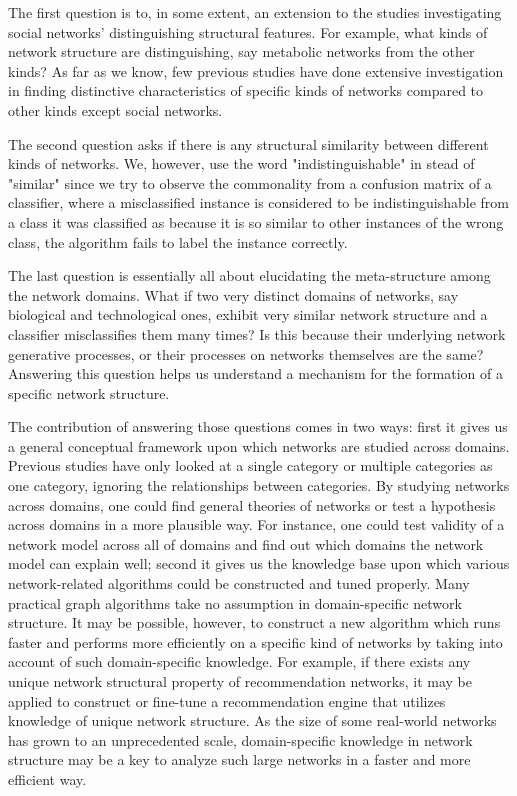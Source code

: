 The first question is to, in some extent, an extension to the studies investigating social networks' distinguishing structural features. For example, what kinds of network structure are distinguishing, say metabolic networks from the other kinds? As far as we know, few previous studies have done extensive investigation in finding distinctive characteristics of specific kinds of networks compared to other kinds except social networks.

The second question asks if there is any structural similarity between different kinds of networks. We, however, use the word "indistinguishable" in stead of "similar" since we try to observe the commonality from a confusion matrix of a classifier, where a misclassified instance is considered to be indistinguishable from a class it was classified as because it is so similar to other instances of the wrong class, the algorithm fails to label the instance correctly.


The last question is essentially all about elucidating the meta-structure among the network domains. What if two very distinct domains of networks, say biological and technological ones, exhibit very similar network structure and a classifier misclassifies them many times? Is this because their underlying network generative processes, or their processes on networks themselves are the same? Answering this question helps us understand a mechanism for the formation of a specific network structure.


The contribution of answering those questions comes in two ways: first it gives us a general conceptual framework upon which networks are studied across domains. Previous studies have only looked at a single category or multiple categories as one category, ignoring the relationships between categories. By studying networks across domains, one could find general theories of networks or test a hypothesis across domains in a more plausible way.  For instance, one could test validity of a network model across all of domains and find out which domains the network model can explain well; second it gives us the knowledge base upon which various network-related algorithms could be constructed and tuned properly.  Many practical graph algorithms take no assumption in domain-specific network structure. It may be possible, however, to construct a new algorithm which runs faster and performs more efficiently on a specific kind of networks by taking into account of such domain-specific knowledge. For example, if there exists any unique network structural property of recommendation networks,  it may be applied to construct or fine-tune a recommendation engine that utilizes knowledge of unique network structure. As the size of some real-world networks has grown to an unprecedented scale, domain-specific knowledge in network structure may be a key to analyze such large networks in a faster and more efficient way.

